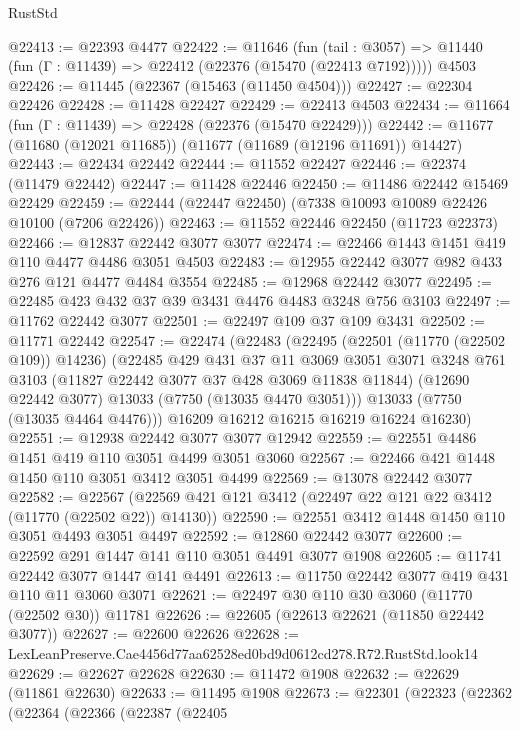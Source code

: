 \begin{lexlean}{RustStd}
\begin{coremodule}
@22413 := @22393 @4477
@22422 := @11646
    (fun (tail : @3057) => @11440 (fun (Γ : @11439) => @22412 (@22376 (@15470 (@22413 @7192)))))
    @4503
@22426 := @11445 (@22367 (@15463 (@11450 @4504)))
@22427 := @22304 @22426
@22428 := @11428 @22427
@22429 := @22413 @4503
@22434 := @11664 (fun (Γ : @11439) => @22428 (@22376 (@15470 @22429)))
@22442 := @11677 (@11680 (@12021 @11685)) (@11677 (@11689 (@12196 @11691)) @14427)
@22443 := @22434 @22442
@22444 := @11552 @22427
@22446 := @22374 (@11479 @22442)
@22447 := @11428 @22446
@22450 := @11486 @22442 @15469 @22429
@22459 := @22444 (@22447 @22450) (@7338 @10093 @10089 @22426 @10100 (@7206 @22426))
@22463 := @11552 @22446 @22450 (@11723 @22373)
@22466 := @12837 @22442 @3077 @3077
@22474 := @22466 @1443 @1451 @419 @110 @4477 @4486 @3051 @4503
@22483 := @12955 @22442 @3077 @982 @433 @276 @121 @4477 @4484 @3554
@22485 := @12968 @22442 @3077
@22495 := @22485 @423 @432 @37 @39 @3431 @4476 @4483 @3248 @756 @3103
@22497 := @11762 @22442 @3077
@22501 := @22497 @109 @37 @109 @3431
@22502 := @11771 @22442
@22547 := @22474
    (@22483
      (@22495
        (@22501 (@11770 (@22502 @109)) @14236)
        (@22485
          @429
          @431
          @37
          @11
          @3069
          @3051
          @3071
          @3248
          @761
          @3103
          (@11827 @22442 @3077 @37 @428 @3069 @11838 @11844)
          (@12690 @22442 @3077)
          @13033
          (@7750 (@13035 @4470 @3051)))
        @13033
        (@7750 (@13035 @4464 @4476)))
      @16209
      @16212
      @16215
      @16219
      @16224
      @16230)
@22551 := @12938 @22442 @3077 @3077 @12942
@22559 := @22551 @4486 @1451 @419 @110 @3051 @4499 @3051 @3060
@22567 := @22466 @421 @1448 @1450 @110 @3051 @3412 @3051 @4499
@22569 := @13078 @22442 @3077
@22582 := @22567 (@22569 @421 @121 @3412 (@22497 @22 @121 @22 @3412 (@11770 (@22502 @22)) @14130))
@22590 := @22551 @3412 @1448 @1450 @110 @3051 @4493 @3051 @4497
@22592 := @12860 @22442 @3077
@22600 := @22592 @291 @1447 @141 @110 @3051 @4491 @3077 @1908
@22605 := @11741 @22442 @3077 @1447 @141 @4491
@22613 := @11750 @22442 @3077 @419 @431 @110 @11 @3060 @3071
@22621 := @22497 @30 @110 @30 @3060 (@11770 (@22502 @30)) @11781
@22626 := @22605 (@22613 @22621 (@11850 @22442 @3077))
@22627 := @22600 @22626
@22628 := LexLeanPreserve.Cae4456d77aa62528ed0bd9d0612cd278.R72.RustStd.look14
@22629 := @22627 @22628
@22630 := @11472 @1908
@22632 := @22629 (@11861 @22630)
@22633 := @11495 @1908
@22673 := @22301
    (@22323
      (@22362
        (@22364
          (@22366
            (@22387
              (@22405

\end{coremodule}
\end{lexlean}
